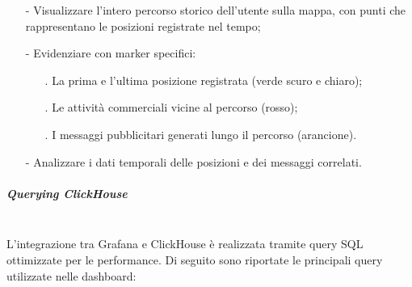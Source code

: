 \documentclass[10pt]{article}
\newcommand{\mysubparagraph}[1]{\subparagraph{#1}\mbox{}\\}
\begin{document}
        \begin{itemize}
            \item[-] Visualizzare l'intero percorso storico dell'utente sulla mappa, con punti che rappresentano le posizioni registrate nel tempo;
            \item[-] Evidenziare con marker specifici:
            \begin{itemize}
                \item[.] La prima e l'ultima posizione registrata (verde scuro e chiaro);
                \item[.] Le attività commerciali vicine al percorso (rosso);
                \item[.] I messaggi pubblicitari generati lungo il percorso (arancione).
            \end{itemize}
            \item[-] Analizzare i dati temporali delle posizioni e dei messaggi correlati.
        \end{itemize}

        \mysubparagraph{Querying ClickHouse}
        L'integrazione tra Grafana e ClickHouse è realizzata tramite query SQL ottimizzate per le performance. Di seguito sono riportate le principali query utilizzate nelle dashboard:
\end{document}
